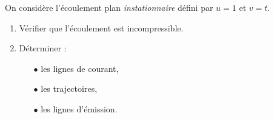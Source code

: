 On consid\`ere l'\'ecoulement plan \textit{instationnaire} d\'efini
par $u = 1$ et $v = t$.
\begin{enumerate}
\item V\'erifier que l'\'ecoulement est incompressible.
\item D\'eterminer :
  \begin{itemize}
  \item[$\bullet$] les lignes de courant,
  \item[$\bullet$] les trajectoires,
  \item[$\bullet$] les lignes d'\'emission.
  \end{itemize}
\end{enumerate}



